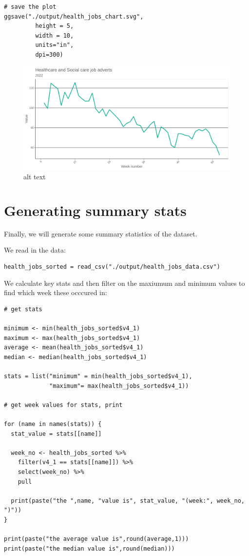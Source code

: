 \documentclass[
]{book}
\begin{document}
\begin{verbatim}
# save the plot
ggsave("./output/health_jobs_chart.svg",
         height = 5,
         width = 10,
         units="in",
         dpi=300)
\end{verbatim}

\begin{figure}
\centering
\includegraphics{health_jobs_chart.svg}
\caption{alt text}
\end{figure}

\hypertarget{generating-summary-stats}{%
\section{Generating summary stats}\label{generating-summary-stats}}

Finally, we will generate some summary statistics of the dataset.

We read in the data:

\begin{verbatim}
health_jobs_sorted = read_csv("./output/health_jobs_data.csv")
\end{verbatim}

We calculate key stats and then filter on the maxiumum and minimum values to find which week these occcured in:

\begin{verbatim}
# get stats

minimum <- min(health_jobs_sorted$v4_1)
maximum <- max(health_jobs_sorted$v4_1)
average <- mean(health_jobs_sorted$v4_1)
median <- median(health_jobs_sorted$v4_1)

stats = list("minimum" = min(health_jobs_sorted$v4_1),
             "maximum"= max(health_jobs_sorted$v4_1))

# get week values for stats, print

for (name in names(stats)) {
  stat_value = stats[[name]]

  week_no <- health_jobs_sorted %>%
    filter(v4_1 == stats[[name]]) %>%
    select(week_no) %>%
    pull

  print(paste("the ",name, "value is", stat_value, "(week:", week_no, ")"))
}

print(paste("the average value is",round(average,1)))
print(paste("the median value is",round(median)))
\end{verbatim}
\end{document}
